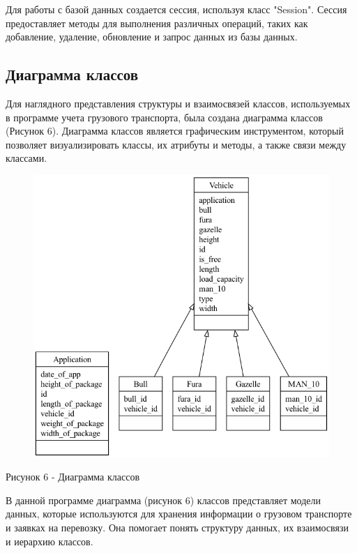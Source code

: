 \documentclass[14pt]{extreport}
\begin{document}
    Для работы с базой данных создается сессия, используя класс "Session". Сессия предоставляет методы для выполнения различных операций, таких как добавление, удаление, обновление и запрос данных из базы данных.

    \subsection{Диаграмма классов}

    Для наглядного представления структуры и взаимосвязей классов, используемых в программе учета грузового транспорта, была создана диаграмма классов (Рисунок 6). Диаграмма классов является графическим инструментом, который позволяет визуализировать классы, их атрибуты и методы, а также связи между классами.

    \begin{figure}[H]
        \centering
        \includegraphics[scale=0.5]{classes_Vehicle.png}
    \end{figure}
    \begin{center}
        Рисунок 6 - Диаграмма классов 
    \end{center}

    В данной программе диаграмма (рисунок 6) классов представляет модели данных, которые используются для хранения информации о грузовом транспорте и заявках на перевозку. Она помогает понять структуру данных, их взаимосвязи и иерархию классов.
\end{document}
